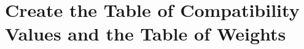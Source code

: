 \documentclass[ijgi,article,submit,moreauthors,pdftex]{Definitions/mdpi}
\begin{document}
%
%
%
\appendix
\section{Create the Table of Compatibility Values and the Table of Weights}



%
\end{document}
